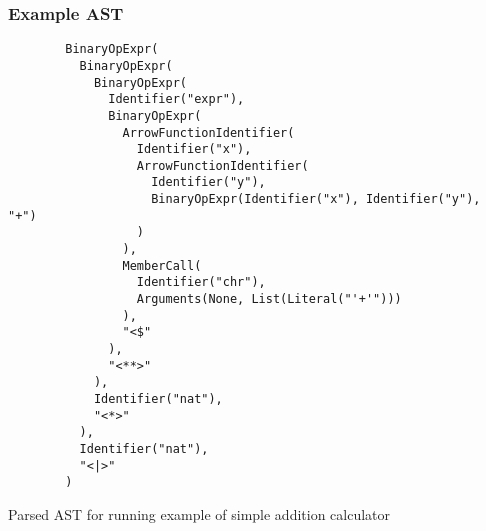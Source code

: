 \subsubsection*{Example AST}
\begin{capminted}
    \begin{verbatim}
        BinaryOpExpr(
          BinaryOpExpr(
            BinaryOpExpr(
              Identifier("expr"),
              BinaryOpExpr(
                ArrowFunctionIdentifier(
                  Identifier("x"),
                  ArrowFunctionIdentifier(
                    Identifier("y"),
                    BinaryOpExpr(Identifier("x"), Identifier("y"), "+")
                  )
                ),
                MemberCall(
                  Identifier("chr"),
                  Arguments(None, List(Literal("'+'")))
                ),
                "<$"
              ),
              "<**>"
            ),
            Identifier("nat"),
            "<*>"
          ),
          Identifier("nat"),
          "<|>"
        )
    \end{verbatim}
    \vspace{-0.5\baselineskip}
    \caption{Parsed AST for running example of simple addition calculator}
    \label{lst:running_ast}
\end{capminted}